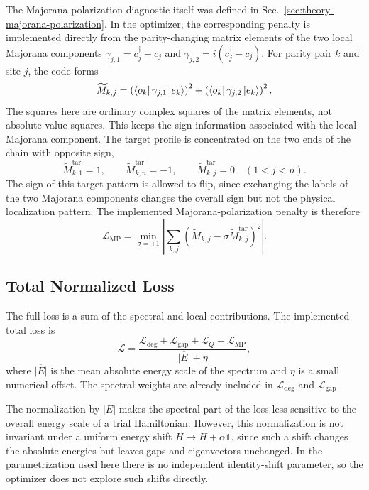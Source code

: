 The Majorana-polarization diagnostic itself was defined in Sec.~\ref{sec:theory-majorana-polarization}. In the optimizer, the corresponding penalty is implemented directly from the parity-changing matrix elements of the two local Majorana components $\gamma_{j,1}=c_j^\dagger+c_j$ and $\gamma_{j,2}=i(c_j^\dagger-c_j)$. For parity pair $k$ and site $j$, the code forms
\begin{equation}
\widetilde{M}_{k,j}
=
\left(
\bra{o_k}\gamma_{j,1}\ket{e_k}
\right)^2
+
\left(
\bra{o_k}\gamma_{j,2}\ket{e_k}
\right)^2 .
\end{equation}
The squares here are ordinary complex squares of the matrix elements, not absolute-value squares. This keeps the sign information associated with the local Majorana component.
The target profile is concentrated on the two ends of the chain with opposite sign,
\begin{equation}
\widetilde{M}^{\mathrm{tar}}_{k,1}=1,
\qquad
\widetilde{M}^{\mathrm{tar}}_{k,n}=-1,
\qquad
\widetilde{M}^{\mathrm{tar}}_{k,j}=0
\quad
(1<j<n).
\end{equation}
The sign of this target pattern is allowed to flip, since exchanging the labels of the two Majorana components changes the overall sign but not the physical localization pattern. The implemented Majorana-polarization penalty is therefore
\begin{equation}
\mathcal{L}_{\mathrm{MP}}
=
\min_{\sigma=\pm1}
\left|
\sum_{k,j}
\left(
\widetilde{M}_{k,j}
-
\sigma \widetilde{M}^{\mathrm{tar}}_{k,j}
\right)^2
\right|.
\end{equation}

\subsection{Total Normalized Loss}
The full loss is a sum of the spectral and local contributions. The implemented total loss is
\begin{equation}
\mathcal{L}
=
\frac{
\mathcal{L}_{\mathrm{deg}}
+
\mathcal{L}_{\mathrm{gap}}
+
\mathcal{L}_{Q}
+
\mathcal{L}_{\mathrm{MP}}
}{
\overline{|E|}+\eta
},
\end{equation}
where $\overline{|E|}$ is the mean absolute energy scale of the spectrum and $\eta$ is a small numerical offset. The spectral weights are already included in $\mathcal{L}_{\mathrm{deg}}$ and $\mathcal{L}_{\mathrm{gap}}$.

The normalization by $\overline{|E|}$ makes the spectral part of the loss less sensitive to the overall energy scale of a trial Hamiltonian. However, this normalization is not invariant under a uniform energy shift $H\mapsto H+\alpha\mathbb{1}$, since such a shift changes the absolute energies but leaves gaps and eigenvectors unchanged. In the parametrization used here there is no independent identity-shift parameter, so the optimizer does not explore such shifts directly.

